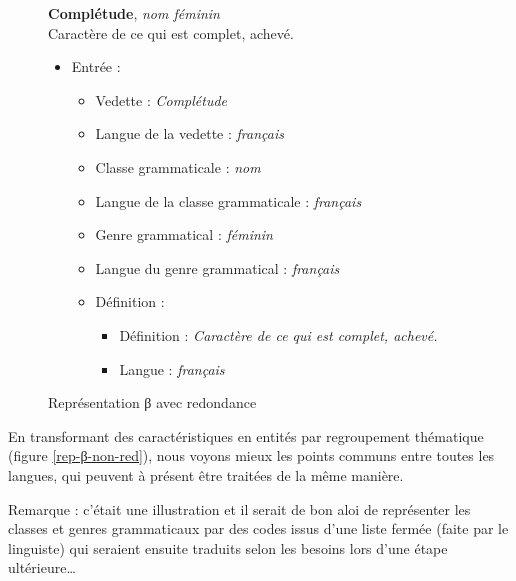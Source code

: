 \documentclass[10pt]{report}
\newcommand{\entité}[1]{\textcolor{blue!80!black}{#1}}
\newcommand{\caractéristique}[1]{\textcolor{green!60!black}{#1}}
\begin{document}
\begin{figure}[H]
	\centering
	\begin{minipage}{0.3\linewidth}
    \textbf{Complétude}, \textit{nom féminin}\\    
    Caractère de ce qui est complet, achevé.
	\end{minipage}%
	\begin{minipage}{0.5\linewidth}
    \begin{itemize}
    	\item \entité{Entrée} :
    	\begin{itemize}
        \item \caractéristique{Vedette} : \textit{Complétude}
        \item \caractéristique{Langue de la vedette} : \textit{français}
        \item \caractéristique{Classe grammaticale} : \textit{nom}
        \item \caractéristique{Langue de la classe grammaticale} : \textit{français}
        \item \caractéristique{Genre grammatical} : \textit{féminin}
        \item \caractéristique{Langue du genre grammatical} : \textit{français}
        \item \entité{Définition} :
        \begin{itemize}
        	\item \caractéristique{Définition} : \textit{Caractère de ce qui est complet, achevé.}
        	\item \caractéristique{Langue} : \textit{français}
        \end{itemize}
    	\end{itemize}
    \end{itemize}
	\end{minipage}
	\caption{Représentation β avec redondance}
	\label{rep-β-red}
\end{figure}

En transformant des caractéristiques en entités par regroupement thématique (figure \ref{rep-β-non-red}), nous voyons mieux les points communs entre toutes les \caractéristique{langues}, qui peuvent à présent être traitées de la même manière.

\bigskip

Remarque : c’était une illustration et il serait de bon aloi de représenter les classes et genres grammaticaux par des codes issus d’une liste fermée (faite par le linguiste) qui seraient ensuite traduits selon les besoins lors d’une étape ultérieure…
\end{document}
